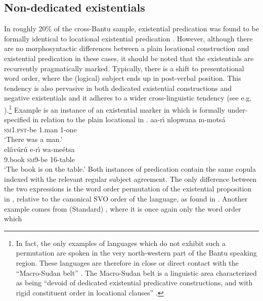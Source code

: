 \documentclass[output=paper]{langscibook}
\begin{document}
\subsection{Non-dedicated existentials}\label{sec:1:3.1}
In roughly 20\% of the cross-Bantu sample, existential predication was found to be formally identical to locational existential predication \citep{BernanderDevos2018}. However, although there are no morphosyntactic differences between a plain locational construction and existential predication in these cases, it should be noted that the existentials are recurrently pragmatically marked. Typically, there is a shift to presentational word order, where the (logical) subject ends up in post-verbal position. This tendency is also pervasive in both dedicated existential constructions and negative existentials and it adheres to a wider cross-linguistic tendency (see e.g. \citealt{Freeze1992,BentleyCiconte2013}).\footnote{In fact, the only examples of languages which do not exhibit such a permutation are spoken in the very north-western part of the Bantu speaking region. These languages are therefore in close or direct contact with the ``Macro-Sudan belt'' \citep{Guldemann2008}. The Macro-Sudan belt is a linguistic area characterized as being ``devoid of dedicated existential predicative constructions, and with rigid constituent order in locational clauses'' \citep[22]{Creissels2014}.} Example  is an instance of an existential marker in  which is formally under-specified in relation to the plain locational in .
\ea\label{ex:makhuwa-man-table}
\ea\label{ex:makhuwa-man}
\gll aa-r{\'\i} nlopwana  m-mots{\'a}\\
     \textsc{sm}1.\textsc{pst}-be 1.man 1-one\\
\glt `There was a man.'\\
\ex\label{ex:makhuwa-table}
\gll eli{\'\i}v{\'u}r{\'u} e-r{\'\i} wa-me{\'e}tsa\\
	9.book \textsc{sm}9-be 16-table\\
\glt `The book is on the table.'
\z\z
Both instances of predication contain the same copula indexed with the
relevant regular subject agreement. The only difference between the two
expressions is the word order permutation of the existential proposition in
, relative to the canonical SVO order of the language,
as found in . Another example comes from
(Standard)
, where it is once again only the word order which
\end{document}
